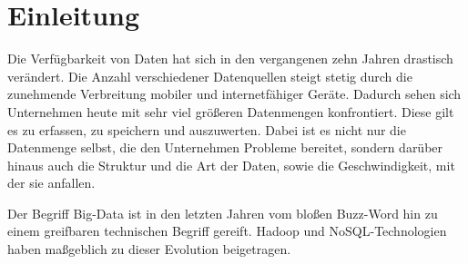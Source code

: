 \chapter{Einleitung}

Die Verfügbarkeit von Daten hat sich in den vergangenen zehn Jahren drastisch verändert. Die Anzahl verschiedener Datenquellen steigt stetig durch die zunehmende Verbreitung mobiler und internetfähiger Geräte. Dadurch sehen sich Unternehmen heute mit sehr viel größeren Datenmengen konfrontiert. Diese gilt es zu erfassen, zu speichern und auszuwerten. Dabei ist es nicht nur die Datenmenge selbst, die den Unternehmen Probleme bereitet, sondern darüber hinaus auch die Struktur und die Art der Daten, sowie die Geschwindigkeit, mit der sie anfallen. 

Der Begriff Big-Data ist in den letzten Jahren vom bloßen Buzz-Word hin zu einem greifbaren technischen Begriff gereift. Hadoop und NoSQL-Technologien haben maßgeblich zu dieser Evolution beigetragen.